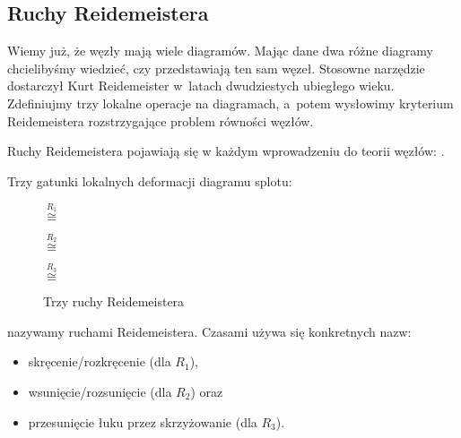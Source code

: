 
\subsection{Ruchy Reidemeistera}

Wiemy już, że węzły mają wiele diagramów.
Mając dane dwa różne diagramy chcielibyśmy wiedzieć, czy przedstawiają ten sam węzeł.
Stosowne narzędzie dostarczył Kurt Reidemeister w~latach dwudziestych ubiegłego wieku.
%
Zdefiniujmy trzy lokalne operacje na diagramach, a~potem wysłowimy kryterium Reidemeistera rozstrzygające problem równości węzłów.

Ruchy Reidemeistera pojawiają się w każdym wprowadzeniu do teorii węzłów: \cite[s. 10, 11]{burde2014}.

\begin{definition}
%
    Trzy gatunki lokalnych deformacji diagramu splotu:
    \begin{figure}[H]
    \centering
    \begin{minipage}[b]{.22\linewidth}%
        \centering%
        \MedLarReidemeisterOneLeft $\stackrel{R_1}{\cong}$ \MedLarReidemeisterOneStraight%
    \end{minipage}
    \quad\quad\quad
    \begin{minipage}[b]{.2\linewidth}
        \centering
        \MedLarReidemeisterTwoA $\stackrel{R_2}{\cong}$ \MedLarReidemeisterTwoB
    \end{minipage}
    \quad\quad\quad
    \begin{minipage}[b]{.32\linewidth}
        \centering
        \MedLarReidemeisterThreeA $\stackrel{R_3}{\cong}$ \MedLarReidemeisterThreeB
    \end{minipage}
    \caption[reidemeister-moves]{Trzy ruchy Reidemeistera}
    \end{figure}
    nazywamy ruchami Reidemeistera.
    Czasami używa się konkretnych nazw:
    \begin{itemize}
        \item skręcenie/rozkręcenie (dla $R_1$),
        \item wsunięcie/rozsunięcie (dla $R_2$) oraz
        \item przesunięcie łuku przez skrzyżowanie (dla $R_3$).
    \end{itemize}
\end{definition}

